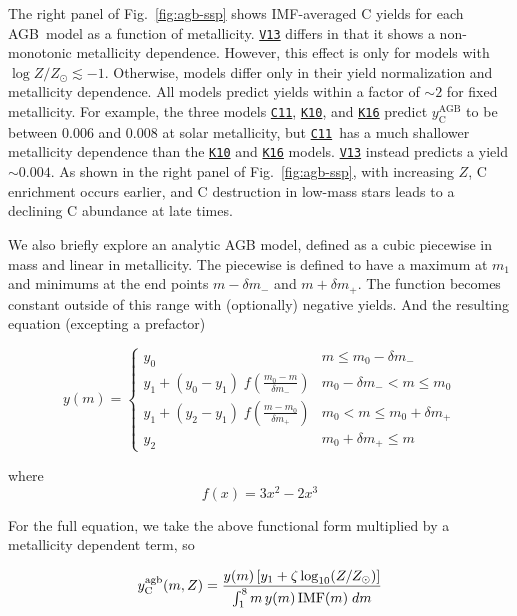\documentclass[fleqn,usenatbib]{mnras}
\newcommand{\cxi}{\texttt{\hyperlink{C11}{C11}}}
\newcommand{\kx}{\texttt{\hyperlink{K10}{K10}}}
\newcommand{\kxvi}{\texttt{\hyperlink{K16}{K16}}}
\newcommand{\vxiii}{\texttt{\hyperlink{V13}{V13}}}
\newcommand{\agb}{AGB}
\newcommand{\imf}{IMF}
\newcommand{\Ycagb}{\ensuremath{y_{\rm C}^{\rm agb}}}
\newcommand{\about}[1]{${\sim} #1$}
\begin{document}
The right panel of Fig.~\ref{fig:agb-ssp} shows \imf-averaged C yields for each \agb\ model as a function of metallicity.
\vxiii{} differs in that it shows a non-monotonic metallicity dependence. However, this effect is only for models with $\log Z/Z_\odot \lesssim -1$.
Otherwise, models differ only in their yield normalization and metallicity dependence. All models predict yields within a factor of \about{2} for fixed metallicity.
For example, the three models \cxi, \kx{}, and \kxvi{} predict $y_\text{C}^\text{AGB}$ to be between 0.006 and 0.008 at solar metallicity, but \cxi\ has a much shallower metallicity dependence than the \kx{} and \kxvi{} models. \vxiii{} instead predicts a yield \about{0.004}.
    As shown in the right panel of Fig.~\ref{fig:agb-ssp}, with increasing $Z$, C enrichment occurs earlier, and C destruction in low-mass stars leads to a declining C abundance at late times.


We also briefly explore an analytic AGB model, defined as a cubic piecewise in mass and linear in metallicity.
The piecewise is defined to have a maximum at $m_1$ and minimums at
the end points $m-\delta m_-$ and $m+\delta m_+$. The function becomes constant
outside of this range with (optionally) negative yields.
And the resulting equation (excepting a prefactor)

\begin{equation}
y(m) = 
\begin{cases}
y_0 & m \leq m_0 - \delta m_- \\
y_1 + (y_0 - y_1)\; f\!\left(\frac{m_0 - m}{\delta m_-}\right) 
    & m_0 - \delta m_- < m \leq m_0 \\
    y_1 + (y_2 - y_1)\; f\!\left(\frac{m - m_0}{\delta m_+}\right)
    & m_0 < m \leq m_0 + \delta m_+ \\
y_2 & m_0 + \delta m_+ \leq m
\end{cases}
\end{equation}

where 
\begin{equation}
    f(x) = 3x^2 - 2x^3
\end{equation}

For the full equation, we take the above functional form multiplied by a
metallicity dependent term, so 

\begin{equation}
\Ycagb(m, Z) = \frac{y(m) \left[y_1 + \zeta \log_{10}(Z/Z_\odot) \right]}{\int_1^8 m\,y(m)\,{\rm IMF}(m)\;dm}
\end{equation}
\end{document}
